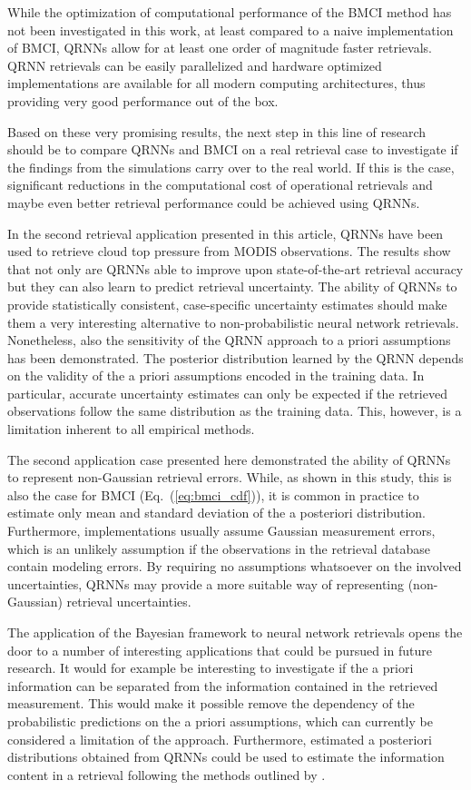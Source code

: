 \documentclass[journal abbreviation, manuscript]{copernicus}
\begin{document}
While the optimization of computational performance of the BMCI method has not been
investigated in this work, at least compared to a naive implementation of BMCI,
QRNNs allow for at least one order of magnitude faster retrievals. QRNN retrievals
can be easily parallelized and hardware optimized implementations are available
for all modern computing architectures, thus providing very good performance out
of the box.

Based on these very promising results, the next step in this line of research
should be to compare QRNNs and BMCI on a real retrieval case to investigate if
the findings from the simulations carry over to the real world. If this is the
case, significant reductions in the computational cost of operational retrievals
and maybe even better retrieval performance could be achieved using QRNNs.

In the second retrieval application presented in this article, QRNNs have been
used to retrieve cloud top pressure from MODIS observations. The results show
that not only are QRNNs able to improve upon state-of-the-art retrieval accuracy
but they can also learn to predict retrieval uncertainty. The ability of QRNNs
to provide statistically consistent, case-specific uncertainty estimates should
make them a very interesting alternative to non-probabilistic neural network
retrievals. Nonetheless, also the sensitivity of the QRNN approach to a priori
assumptions has been demonstrated. The posterior distribution learned by the
QRNN depends on the validity of the a priori assumptions encoded in the training
data. In particular, accurate uncertainty estimates can only be expected if the
retrieved observations follow the same distribution as the training data. This,
however, is a limitation inherent to all empirical methods.

The second application case presented here demonstrated the ability of QRNNs to represent
non-Gaussian retrieval errors. While, as shown in this study, this is also the case
for BMCI (Eq.~(\ref{eq:bmci_cdf})), it is common in practice to estimate only mean and standard
deviation of the a posteriori distribution. Furthermore, implementations usually
assume Gaussian measurement errors, which is an unlikely assumption if the
observations in the retrieval database contain modeling errors. By requiring no
assumptions whatsoever on the involved uncertainties, QRNNs may provide a more
suitable way of representing (non-Gaussian) retrieval uncertainties.

The application of the Bayesian framework to neural network retrievals opens the
door to a number of interesting applications that could be pursued in future
research. It would for example be interesting to investigate if the a priori
information can be separated from the information contained in the retrieved
measurement. This would make it possible remove the dependency of the
probabilistic predictions on the a priori assumptions, which can currently be
considered a limitation of the approach. Furthermore, estimated a posteriori
distributions obtained from QRNNs could be used to estimate the information
content in a retrieval following the methods outlined by \citet{rodgers}.
\end{document}
